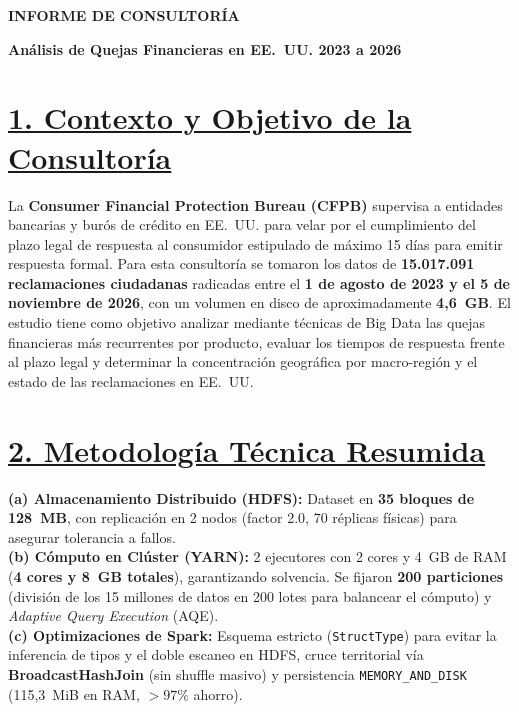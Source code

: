 \documentclass[12pt,letterpaper]{article}
\begin{document}
{\centering
    {\fontsize{13}{15}\selectfont \textbf{INFORME DE CONSULTORÍA}}\par
    \vspace{0.15em}
    {\fontsize{11}{13}\selectfont \textbf{Análisis de Quejas Financieras en EE.~UU. 2023 a 2026}}\par
}
\vspace{0.2em}

\section*{\underline{1. Contexto y Objetivo de la Consultoría}}
La \textbf{Consumer Financial Protection Bureau (CFPB)} supervisa a entidades bancarias y burós de crédito en EE.~UU. para velar por el cumplimiento del plazo legal de respuesta al consumidor estipulado de máximo 15 días para emitir respuesta formal. Para esta consultoría se tomaron los datos de \textbf{15.017.091 reclamaciones ciudadanas} radicadas entre el \textbf{1 de agosto de 2023 y el 5 de noviembre de 2026}, con un volumen en disco de aproximadamente \textbf{4,6~GB}. El estudio tiene como objetivo analizar mediante técnicas de Big Data las quejas financieras más recurrentes por producto, evaluar los tiempos de respuesta frente al plazo legal y determinar la concentración geográfica por macro-región y el estado de las reclamaciones en EE.~UU.

\section*{\underline{2. Metodología Técnica Resumida}}
\textbf{(a) Almacenamiento Distribuido (HDFS):} Dataset en \textbf{35 bloques de 128~MB}, con replicación en 2 nodos (factor 2.0, 70 réplicas físicas) para asegurar tolerancia a fallos. \\
\textbf{(b) Cómputo en Clúster (YARN):} 2 ejecutores con 2 cores y 4~GB de RAM (\textbf{4 cores y 8~GB totales}), garantizando solvencia. Se fijaron \textbf{200 particiones} (división de los 15 millones de datos en 200 lotes para balancear el cómputo) y \textit{Adaptive Query Execution} (AQE). \\
\textbf{(c) Optimizaciones de Spark:} Esquema estricto (\texttt{StructType}) para evitar la inferencia de tipos y el doble escaneo en HDFS, cruce territorial vía \textbf{BroadcastHashJoin} (sin shuffle masivo) y persistencia \texttt{MEMORY\_AND\_DISK} (115,3~MiB en RAM, $>97\%$ ahorro).
\end{document}
